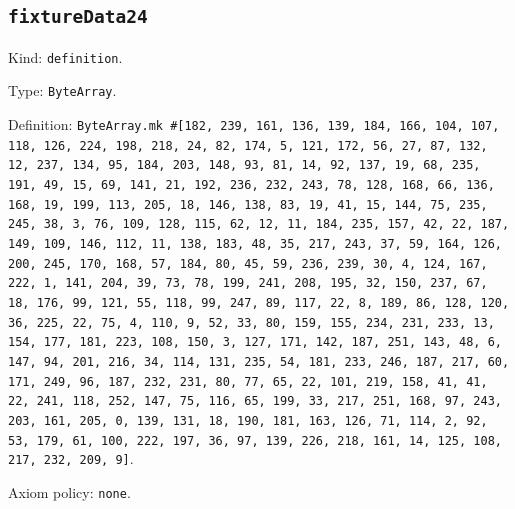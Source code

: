 \documentclass[11pt]{article}
\begin{document}
\subsection*{\texttt{fixtureData24}}
\noindent Kind: \texttt{definition}.\par
\noindent Type: \texttt{ByteArray}.\par
\noindent Definition: \texttt{ByteArray.mk \#[182, 239, 161, 136, 139, 184, 166, 104, 107, 118, 126, 224, 198, 218, 24, 82, 174, 5, 121, 172, 56, 27, 87, 132, 12, 237, 134, 95, 184, 203, 148, 93, 81, 14, 92, 137, 19, 68, 235, 191, 49, 15, 69, 141, 21, 192, 236, 232, 243, 78, 128, 168, 66, 136, 168, 19, 199, 113, 205, 18, 146, 138, 83, 19, 41, 15, 144, 75, 235, 245, 38, 3, 76, 109, 128, 115, 62, 12, 11, 184, 235, 157, 42, 22, 187, 149, 109, 146, 112, 11, 138, 183, 48, 35, 217, 243, 37, 59, 164, 126, 200, 245, 170, 168, 57, 184, 80, 45, 59, 236, 239, 30, 4, 124, 167, 222, 1, 141, 204, 39, 73, 78, 199, 241, 208, 195, 32, 150, 237, 67, 18, 176, 99, 121, 55, 118, 99, 247, 89, 117, 22, 8, 189, 86, 128, 120, 36, 225, 22, 75, 4, 110, 9, 52, 33, 80, 159, 155, 234, 231, 233, 13, 154, 177, 181, 223, 108, 150, 3, 127, 171, 142, 187, 251, 143, 48, 6, 147, 94, 201, 216, 34, 114, 131, 235, 54, 181, 233, 246, 187, 217, 60, 171, 249, 96, 187, 232, 231, 80, 77, 65, 22, 101, 219, 158, 41, 41, 22, 241, 118, 252, 147, 75, 116, 65, 199, 33, 217, 251, 168, 97, 243, 203, 161, 205, 0, 139, 131, 18, 190, 181, 163, 126, 71, 114, 2, 92, 53, 179, 61, 100, 222, 197, 36, 97, 139, 226, 218, 161, 14, 125, 108, 217, 232, 209, 9]}.\par
\noindent Axiom policy: \texttt{none}.\par
\end{document}
